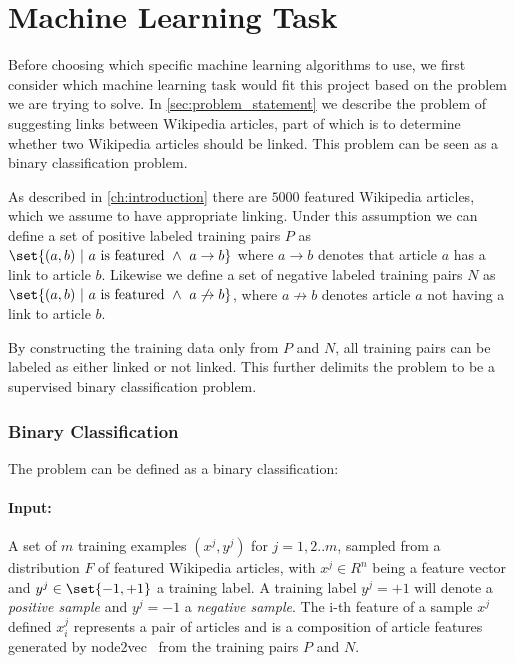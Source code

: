 

\section{Machine Learning Task}\label{sec:machine_learning_task}
Before choosing which specific machine learning algorithms to use, we first consider which machine learning task would fit this project based on the problem we are trying to solve. In \cref{sec:problem_statement} we describe the problem of suggesting links between Wikipedia articles, part of which is to determine whether two Wikipedia articles should be linked. This problem can be seen as a binary classification problem.

As described in \cref{ch:introduction} there are $5000$ featured Wikipedia articles, which we assume to have appropriate linking. Under this assumption we can define a set of positive labeled training pairs $P$ as $\set{(a,b)\ |\ a\text{ is featured}\ \wedge\ a \to b}$ where $a \to b$ denotes that article $a$ has a link to article $b$. Likewise we define a set of negative labeled training pairs $N$ as  $\set{(a,b)\ |\ a\text{ is featured}\ \wedge\ a \not\to b}$, where $a \not\to b$ denotes article $a$ not having a link to article $b$.

By constructing the training data only from $P$ and $N$, all training pairs can be labeled as either linked or not linked. This further delimits the problem to be a supervised binary classification problem.
 
\subsubsection{Binary Classification}

The problem can be defined as a binary classification:

\paragraph{Input:}
A set of $m$ training examples $(x^j,y^j)$ for $j=1,2..m$, sampled from a distribution $F$ of featured Wikipedia articles, with $x^j \in R^n$ being a feature vector and $y^j \in \set{-1,+1}$ a training label. A training label $y^j=+1$ will denote a \textit{positive sample} and $y^j=-1$ a \textit{negative sample}. The i-th feature of a sample $x^j$ defined $x^j_i$ represents a pair of articles and is a composition of article features generated by node2vec~\cite{node2vec} from the training pairs $P$ and $N$.

